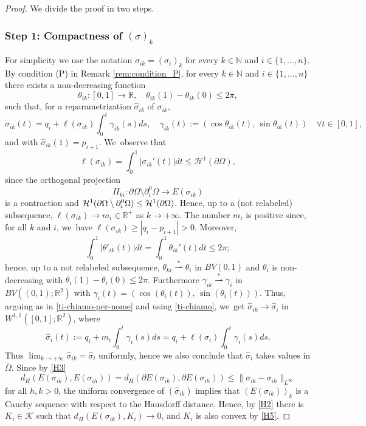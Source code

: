 \documentclass[JEP,XML,SOM,Unicode, NoFloatCountersInSection,published]{cedram}
\newcommand{\R}{\mathbb{R}}
\let\len\ell
\let\Om\Omega
\newcommand{\weakstar}{\stackrel{*}{\rightharpoonup}}
\theoremstyle{definition}
\begin{document}
\begin{proof}We divide the proof in two steps.\vspace*{-.5\baselineskip}

\subsubsection*{Step 1: Compactness of $(\sigma)_k$}
For simplicity we use the notation $\sigma_{ik} = (\sigma_i)_k$ for every $k\in
\mathbb N$ and $i\in\{1,\dots,n\}$.
By condition (P) in Remark \ref{rem:condition_P}, for every $k \in \mathbb N$ and $i\in\{1,\dots,n\}$
there exists a non-decreasing
function
\[
\theta_{ik}\colon[0,1]\to\R,\quad \theta_{ik}(1)-\theta_{ik}(0)\le2\pi,
\]
such that, for a reparametrization $\widehat \sigma_{ik}$ of $\sigma_{ik}$,
\begin{equation*}
\widehat\sigma_{ik}(t)=q_i+ \len(\sigma_{ik})\int_0^t\gamma_{ik}(s)ds,\quad \gamma_{ik}(t):=(\cos\theta_{ik}(t),\,\sin\theta_{ik}(t))
\quad\forall t\in[0,1],
\end{equation*}
and with $\widehat\sigma_{ik}(1)=p_{i+1}$. We~observe that
\begin{equation}\label{ti-chiamo}
\len(\sigma_{ik})=\int_0^1|\sigma_{ik}'(t)|dt\le\mathcal{H}^1(\partial\Om),
\end{equation}
since the orthogonal projection
\[
\Pi_{ki}\colon\partial\Om\setminus\partial^0_i\Om\to E(\sigma_{ik})
\]
is a contraction and $\mathcal{H}^1(\partial\Om\setminus\nobreak\partial^0_i\Om)\le \mathcal{H}^1(\partial\Om)$.
Hence, up to a (not relabeled) subsequence,
$\len(\sigma_{ik})\to m_i\in \R^+$ as $k \to +\infty$. The number $m_i$ is positive since, for all $k$ and $i$, we~have
$\len(\sigma_{ik})\geq |q_i-p_{i+1}|>0$.
Moreover,
\begin{equation*}
\int_0^1|\theta'_{ik}(t)|dt=\int_0^1\theta_{ik}'(t)dt\le2\pi;
\end{equation*}
hence, up to a not relabeled subsequence, $\theta_{ki}\weakstar\theta_i$ in $BV(0,1)$ and $\theta_i$ is non-decreasing with $\theta_i(1)-\theta_i(0)\le2\pi$. Furthermore $\gamma_{ik}\stackrel{*}{\rightharpoonup}\gamma_i$ in $BV((0,1);\R^2)$ with $\gamma_i(t)=(\cos(\theta_i(t)),\,\sin(\theta_i(t)))$. Thus, arguing as in \eqref{ti-chiamo-per-nome} and using \eqref{ti-chiamo}, we~get $\widehat\sigma_{ik}\to\widehat\sigma_i$ in $W^{1,1}([0,1];\R^2)$, where
\begin{equation}\label{sigmai}
\widehat\sigma_i(t):=q_i+m_i\int_0^t\gamma_i(s)ds=q_i+\len(\sigma_i)\int_0^t\gamma_i(s)ds.
\end{equation}
Thus $\lim_{k \to +\infty}\widehat\sigma_{ik}=\widehat\sigma_i$ uniformly, hence we also conclude that $\widehat\sigma_i$ takes values in $\overline\Om$.
Since by \ref{H3}
\[
d_H(E(\sigma_{ik}),E(\sigma_{ih}))=d_H(\partial E(\sigma_{ik}),\partial E(\sigma_{ih}))\leq \|\sigma_{ik}-\sigma_{ih}\|_{L^\infty}
\]
for all $h,k>0$,
the uniform convergence of $(\widehat\sigma_{ik})$ implies that $(E(\sigma_{ik}))_k$ is a Cauchy sequence with respect to the Hausdorff distance. Hence, by \ref{H2} there is $K_i\in\mathcal K$ such that $ d_H(E(\sigma_{ik}),K_i)\to0$, and $K_i$ is also convex by \ref{H5}.


\end{proof}
\end{document}
